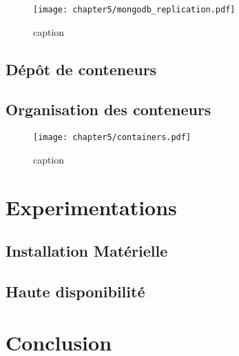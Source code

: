 \begin{figure}[H]
	\centering
	\texttt{[image: chapter5/mongodb\_replication.pdf]}
        \caption{caption}
	\label{fig:mongodb_replication}
\end{figure}

\subsection{Dépôt de conteneurs}

\subsection{Organisation des conteneurs}

\begin{figure}[H]
	\centering
	\texttt{[image: chapter5/containers.pdf]}
        \caption{caption}
	\label{fig:containers}
\end{figure}


\section{Experimentations}

\subsection{Installation Matérielle}

\subsection{Haute disponibilité}

\section{Conclusion}